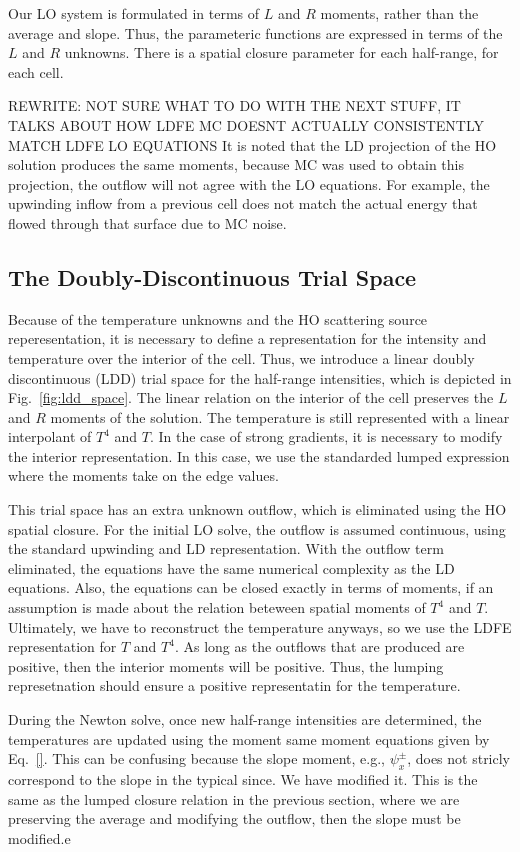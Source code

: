 Our LO system is formulated in terms of $L$ and $R$ moments, rather than the average and
slope.  Thus, the parameteric functions are expressed in terms of the $L$ and $R$
unknowns.  There is a spatial closure parameter for each half-range, for each cell.

REWRITE: NOT SURE WHAT TO DO WITH THE NEXT STUFF, IT TALKS ABOUT HOW LDFE MC DOESNT ACTUALLY
CONSISTENTLY MATCH LDFE LO EQUATIONS
It is noted that the LD projection of the HO solution produces the same moments, because
MC was used to obtain this projection, the outflow will not agree with the LO equations.
For example, the upwinding inflow from a previous cell does not match the actual energy
that flowed through that surface due to MC noise.

\subsection{The Doubly-Discontinuous Trial Space}

Because of the temperature unknowns and the HO scattering source reperesentation, it is necessary to define a representation for
the intensity and temperature over the interior of the cell.  Thus, we introduce a linear doubly
discontinuous (LDD) trial space for the half-range intensities, which is depicted in Fig.~\ref{fig:ldd_space}.
The linear relation on the interior of the cell preserves the $L$ and $R$ moments of the
solution.  The temperature is still represented with a linear interpolant of $T^4$ and
$T$.  In the case of strong gradients, it is necessary to modify the interior representation.  In this case, 
we use the standarded lumped expression where the moments take on the edge values.

This trial space has an extra unknown outflow, which is eliminated using the HO spatial
closure.  For the initial LO solve, the outflow is assumed continuous, using the standard
upwinding and LD representation.  With the outflow term eliminated, the equations
have the same numerical complexity as the LD equations.  Also, the equations can be
closed exactly in terms of moments, if an assumption is made about the relation
beteween spatial moments of $T^4$ and $T$.  Ultimately, we have to reconstruct the
temperature anyways, so we use the LDFE representation for $T$ and $T^4$.  As long as
the outflows that are produced are positive, then the interior moments will be
positive.  Thus, the lumping represetnation should ensure a positive representatin
for the temperature.

During the Newton solve, once new half-range
intensities are determined, the temperatures are updated using the moment same moment
equations given by Eq.~\eqref{}. This can be confusing because the slope moment,
e.g., $\psi_x^\pm$, does not stricly correspond to the slope in the typical since.
We have modified it.  This is the same as the lumped closure relation in the previous
section, where we are preserving the average and modifying the outflow, then the
slope must be modified.e 


